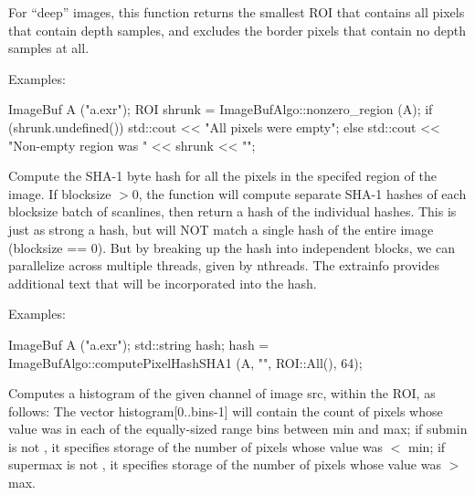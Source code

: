 For ``deep'' images, this function returns the smallest ROI that contains
all pixels that contain depth samples, and excludes the border pixels
that contain no depth samples at all.

\smallskip
\noindent Examples:
\begin{code}
    ImageBuf A ("a.exr");
    ROI shrunk = ImageBufAlgo::nonzero_region (A);
    if (shrunk.undefined())
        std::cout << "All pixels were empty\n";
    else
        std::cout << "Non-empty region was " << shrunk << "\n";
\end{code}
\apiend


 

Compute the SHA-1 byte hash for all the pixels in the specifed region of
the image.  If {\cf blocksize} $> 0$, the function will compute separate
SHA-1 hashes of each {\cf blocksize} batch of scanlines, then return a
hash of the individual hashes.  This is just as strong a hash, but will
NOT match a single hash of the entire image ({\cf blocksize == 0}).  But
by breaking up the hash into independent blocks, we can parallelize
across multiple threads, given by {\cf nthreads}.
The {\cf extrainfo} provides additional text that will be
incorporated into the hash.

\smallskip
\noindent Examples:
\begin{code}
    ImageBuf A ("a.exr");
    std::string hash;
    hash = ImageBufAlgo::computePixelHashSHA1 (A, "", ROI::All(), 64);
\end{code}
\apiend

 
Computes a histogram of the given {\cf channel} of image {\cf src},
within the ROI,
as follows: The vector {\cf histogram[0..bins-1]} will contain the
count of pixels whose value was in each of the equally-sized range
bins between {\cf min} and {\cf max}; if {\cf submin} is not \NULL,
it specifies storage of the number of pixels whose value was
$<$ {\cf min}; if {\cf supermax} is not \NULL, it specifies storage of
the number of pixels whose value was $>$ {\cf max}.

